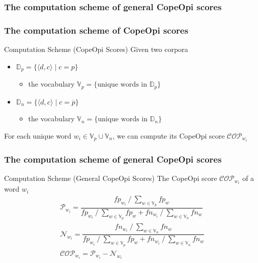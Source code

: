 \documentclass[mathserif]{beamer}
\DeclareMathOperator*{\divby}{/}
\DeclareMathOperator*{\where}{|}
\begin{document}
\subsubsection{The computation scheme of general CopeOpi scores}
\begin{frame}
\frametitle{The computation scheme of CopeOpi scores}
\begin{block}{Computation Scheme (CopeOpi Scores)}
Given two corpora
\begin{itemize}
\item $\mathbb{D}_p=\{\langle d,c \rangle \where c=p\}$
	\begin{itemize}
	\item the vocabulary $\mathbb{V}_p=\{\text{unique words in }\mathbb{D}_p\}$
	\end{itemize}
\item $\mathbb{D}_n=\{\langle d,c \rangle \where c=\overline{p}\}$
	\begin{itemize}
	\item the vocabulary $\mathbb{V}_n=\{\text{unique words in }\mathbb{D}_n\}$
	\end{itemize}
\end{itemize}
For each unique word $w_i \in \mathbb{V}_p \cup \mathbb{V}_n$, we can compute its CopeOpi score $\mathcal{COP}_{w_i}$
\end{block}
\end{frame}
\begin{frame}
\frametitle{The computation scheme of general CopeOpi scores}
\begin{block}{Computation Scheme (General CopeOpi Scores)}
The CopeOpi score $\mathcal{COP}_{w_i}$ of a word $w_i$
\begin{equation*}
\begin{gathered}
\mathcal{P}_{w_i} = \dfrac {
	fp_{w_i} \divby \sum_{w \in \mathbb{V}_p} fp_w
}{
	fp_{w_i} \divby \sum_{w \in \mathbb{V}_p} fp_w +
	fn_{w_i} \divby \sum_{w \in \mathbb{V}_n} fn_w
}
\\
\mathcal{N}_{w_i} = \dfrac {
	fn_{w_i} \divby \sum_{w \in \mathbb{V}_n} fn_w
}{
	fp_{w_i} \divby \sum_{w \in \mathbb{V}_p} fp_w +
	fn_{w_i} \divby \sum_{w \in \mathbb{V}_n} fn_w
}
\\
\mathcal{COP}_{w_i} = \mathcal{P}_{w_i} - \mathcal{N}_{w_i}
\end{gathered}
\end{equation*}
\end{block}
\begin{flushright}
\vspace{-9.5ex}
\end{flushright}
\end{frame}
\end{document}
